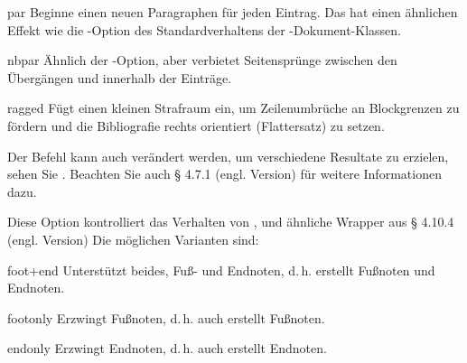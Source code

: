 \documentclass{ltxdockit}[2011/03/25]
\begin{document}
\begin{optionlist}
\begin{valuelist}
\item[par] Beginne einen neuen Paragraphen für jeden Eintrag. Das hat einen
ähnlichen Effekt wie die -Option des Standardverhaltens der
\latex-Dokument-Klassen.

\item[nbpar] Ähnlich der -Option, aber verbietet Seitensprünge zwischen
den Übergängen und innerhalb der Einträge.

\item[ragged] Fügt einen kleinen Strafraum ein, um Zeilenumbrüche an Blockgrenzen 
zu fördern und die Bibliografie rechts orientiert (Flattersatz) zu setzen.

\end{valuelist} 

Der Befehl  kann auch verändert werden, um verschiedene
Resultate zu erzielen, sehen Sie . Beachten Sie auch § 4.7.1 (engl. Version) %
für weitere Informationen dazu.


Diese Option kontrolliert das Verhalten von ,
 und ähnliche Wrapper aus § 4.10.4 
(engl. Version) %
Die mög\-li\-chen Varianten sind:

\begin{valuelist} 
\item[foot+end] Unterstützt beides, Fuß- und Endnoten, d.\,h.
 erstellt Fußnoten und  Endnoten.
\item[footonly] Erzwingt Fußnoten, d.\,h. auch  erstellt
Fußnoten.  
\item[endonly] Erzwingt Endnoten, d.\,h. auch 
erstellt Endnoten.  \end{valuelist}



\end{optionlist}
\end{document}
